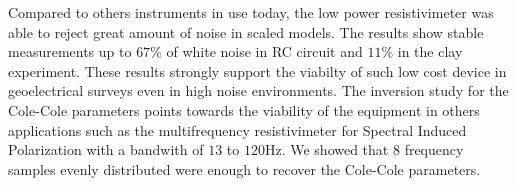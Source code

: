 \documentclass{vie16}
\begin{document}
Compared to others instruments in use today, the low power
resistivimeter was able to reject great amount of noise in scaled
models. The results show stable measurements up to $67\%$ of white
noise in RC circuit and $11 \%$ in the clay experiment. These results
strongly support the viabilty of such low cost device in geoelectrical
surveys even in high noise environments. The inversion study for the
Cole-Cole parameters points towards the viability of the equipment in
others applications such as the multifrequency resistivimeter for
Spectral Induced Polarization with a bandwith of $13$ to $120$Hz. We
showed that $8$ frequency samples evenly distributed were enough to
recover the Cole-Cole parameters.



		
		
		



\end{document}
